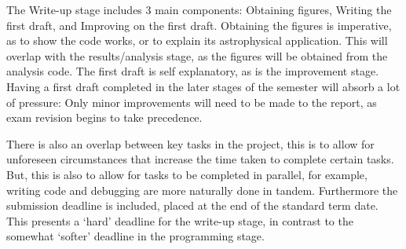 \documentclass[a4paper,10pt]{article}
\begin{document}
The Write-up stage includes 3 main components: Obtaining figures, Writing the first draft, and Improving on the first draft. Obtaining the figures is imperative, as to show the code works, or to explain its astrophysical application. This will overlap with the results/analysis stage, as the figures will be obtained from the analysis code. The first draft is self explanatory, as is the improvement stage. Having a first draft completed in the later stages of the semester will absorb a lot of pressure: Only minor improvements will need to be made to the report, as exam revision begins to take precedence.

There is also an overlap between key tasks in the project, this is to allow for unforeseen circumstances that increase the time taken to complete certain tasks. But, this is also to allow for tasks to be completed in parallel, for example, writing code and debugging are more naturally done in tandem. Furthermore the submission deadline is included, placed at the end of the standard term date. This presents a `hard' deadline for the write-up stage, in contrast to the somewhat `softer' deadline in the programming stage.
\end{document}
